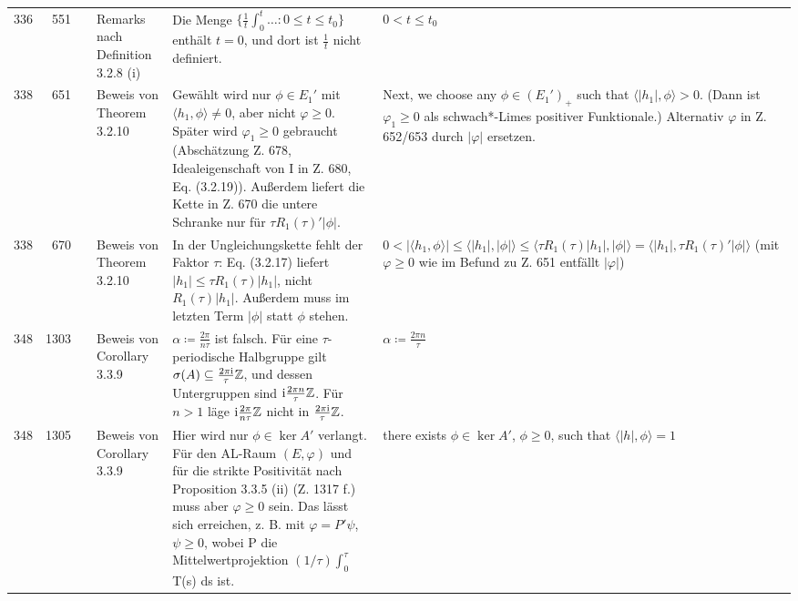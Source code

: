 \documentclass[10pt]{article}
\begin{document}
\begin{longtable}{@{}rrc>{\RaggedRight\arraybackslash}p{3.0cm}>{\RaggedRight\arraybackslash}p{11.4cm}>{\RaggedRight\arraybackslash}p{7.4cm}@{}}
336 & 551 & \sichC{} & Remarks nach Definition 3.2.8 (i) & Die Menge $\{\frac{1}{t}\int_0^t \ldots \colon 0 \leq t \leq t_{0}\}$ enthält $t = 0$, und dort ist $\frac{1}{t}$ nicht definiert. & $0 < t \leq t_{0}$ \\[2pt]
338 & 651 & \sichB{} & Beweis von Theorem 3.2.10 & Gewählt wird nur $\phi \in E_{1}'$ mit $\langle h_{1},\phi\rangle \neq 0$, aber nicht $\ensuremath{\varphi} \ensuremath{\geq} 0$. Später wird $\ensuremath{\varphi}_1 \ensuremath{\geq} 0$ gebraucht (Abschätzung Z. 678, Idealeigenschaft von I in Z. 680, Eq. (3.2.19)). Außerdem liefert die Kette in Z. 670 die untere Schranke nur für $\tau R_{1}(\tau)'\vert\phi\vert$. & {Next, we choose any $\phi \in (E_{1}')_{+}$ such that $\langle \vert h_{1}\vert,\phi \rangle > 0$.} (Dann ist $\ensuremath{\varphi}_1 \ensuremath{\geq} 0$ als schwach*-Limes positiver Funktionale.) Alternativ $\ensuremath{\varphi}$ in Z. 652/653 durch $\vert \ensuremath{\varphi}\vert$ ersetzen. \\[2pt]
338 & 670 & \sichA{} & Beweis von Theorem 3.2.10 & In der Ungleichungskette fehlt der Faktor $\ensuremath{\tau}$: Eq. (3.2.17) liefert $\vert h_{1}\vert \leq \tau R_{1}(\tau)\vert h_{1}\vert$, nicht $R_{1}(\tau)\vert h_{1}\vert$. Außerdem muss im letzten Term $\vert\phi\vert$ statt $\phi$ stehen. & $0 < \vert\langle h_{1},\phi \rangle\vert \leq \langle \vert h_{1}\vert,\vert\phi\vert \rangle \leq \langle \tau R_{1}(\tau)\vert h_{1}\vert,\vert\phi\vert \rangle = \langle \vert h_{1}\vert,\tau R_{1}(\tau)'\vert\phi\vert \rangle$ (mit $\ensuremath{\varphi} \ensuremath{\geq} 0$ wie im Befund zu Z. 651 entfällt $\vert \ensuremath{\varphi}\vert$) \\[2pt]
348 & 1303 & \sichA{} & Beweis von Corollary 3.3.9 & $\alpha \coloneq \frac{2\pi}{n\tau}$ ist falsch. Für eine $\ensuremath{\tau}$-periodische Halbgruppe gilt $\sigma(A) \subseteq \frac{2\pi\mathrm{i}}{\tau}\mathbb{Z}$, und dessen Untergruppen sind $\mathrm{i}\frac{2\pi n}{\tau}\mathbb{Z}$. Für $n > 1$ läge $\mathrm{i}\frac{2\pi}{n\tau}\mathbb{Z}$ nicht in $\frac{2\pi\mathrm{i}}{\tau}\mathbb{Z}$. & $\alpha \coloneq \frac{2\pi n}{\tau}$ \\[2pt]
348 & 1305 & \sichC{} & Beweis von Corollary 3.3.9 & Hier wird nur $\phi \in \ker A'$ verlangt. Für den AL-Raum $(E,\ensuremath{\varphi})$ und für die strikte Positivität nach Proposition 3.3.5 (ii) (Z. 1317 f.) muss aber $\ensuremath{\varphi} \ensuremath{\geq} 0$ sein. Das lässt sich erreichen, z. B. mit $\ensuremath{\varphi} = P'\ensuremath{\psi}$, $\ensuremath{\psi} \ensuremath{\geq} 0$, wobei P die Mittelwertprojektion $(1/\ensuremath{\tau})\ensuremath{\int}_0^\ensuremath{\tau}$ T(s) ds ist. & {there exists $\phi \in \ker A'$, $\phi \geq 0$, such that $\langle\vert h\vert,\phi\rangle = 1$} \\[2pt]

\end{longtable}
\end{document}
